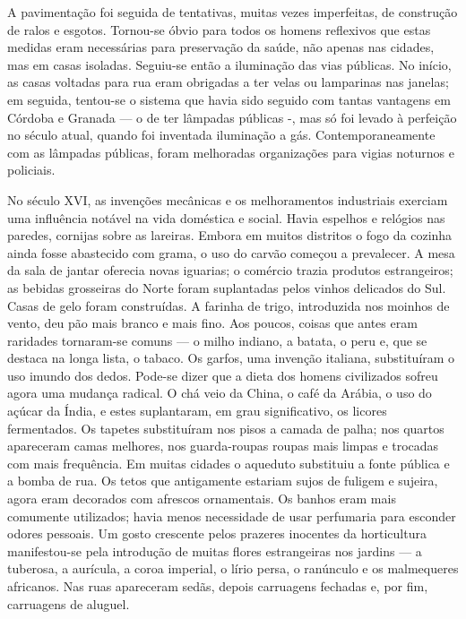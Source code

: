 \documentclass[11pt,a5paper,twoside,openany]{book}
\begin{document}
A pavimentação foi seguida de tentativas, muitas vezes imperfeitas, de construção de ralos e esgotos. Tornou-se óbvio para todos os homens reflexivos que estas medidas eram necessárias para preservação da saúde, não apenas nas cidades, mas em casas isoladas. Seguiu-se então a iluminação das vias públicas. No início, as casas voltadas para rua eram obrigadas a ter velas ou lamparinas nas janelas; em seguida, tentou-se o sistema que havia sido seguido com tantas vantagens em Córdoba e Granada — o de ter lâmpadas públicas -, mas só foi levado à perfeição no século atual, quando foi inventada iluminação a gás. Contemporaneamente com as lâmpadas públicas, foram melhoradas organizações para vigias noturnos e policiais.

No século XVI, as invenções mecânicas e os melhoramentos industriais exerciam uma influência notável na vida doméstica e social. Havia espelhos e relógios nas paredes, cornijas sobre as lareiras. Embora em muitos distritos o fogo da cozinha ainda fosse abastecido com grama, o uso do carvão começou a prevalecer. A mesa da sala de jantar oferecia novas iguarias; o comércio trazia produtos estrangeiros; as bebidas grosseiras do Norte foram suplantadas pelos vinhos delicados do Sul. Casas de gelo foram construídas. A farinha de trigo, introduzida nos moinhos de vento, deu pão mais branco e mais fino. Aos poucos, coisas que antes eram raridades tornaram-se comuns — o milho indiano, a batata, o peru e, que se destaca na longa lista, o tabaco. Os garfos, uma invenção italiana, substituíram o uso imundo dos dedos. Pode-se dizer que a dieta dos homens civilizados sofreu agora uma mudança radical. O chá veio da China, o café da Arábia, o uso do açúcar da Índia, e estes suplantaram, em grau significativo, os licores fermentados. Os tapetes substituíram nos pisos a camada de palha; nos quartos apareceram camas melhores, nos guarda-roupas roupas mais limpas e trocadas com mais frequência. Em muitas cidades o aqueduto substituiu a fonte pública e a bomba de rua. Os tetos que antigamente estariam sujos de fuligem e sujeira, agora eram decorados com afrescos ornamentais. Os banhos eram mais comumente utilizados; havia menos necessidade de usar perfumaria para esconder odores pessoais. Um gosto crescente pelos prazeres inocentes da horticultura manifestou-se pela introdução de muitas flores estrangeiras nos jardins — a tuberosa, a aurícula, a coroa imperial, o lírio persa, o ranúnculo e os malmequeres africanos. Nas ruas apareceram sedãs, depois carruagens fechadas e, por fim, carruagens de aluguel.
\end{document}
